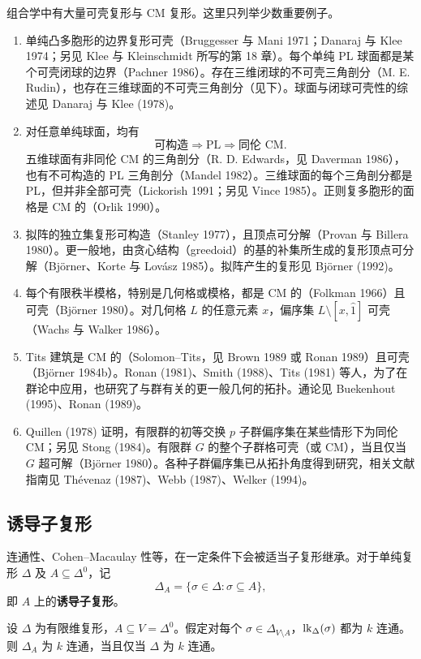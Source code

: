 组合学中有大量可壳复形与 CM 复形。这里只列举少数重要例子。
\begin{enumerate}[label=(\roman*)]
\item 单纯凸多胞形的边界复形可壳（Bruggesser 与 Mani 1971；Danaraj 与 Klee 1974；另见 Klee 与 Kleinschmidt 所写的第 18 章）。每个单纯 PL 球面都是某个可壳闭球的边界（Pachner 1986）。存在三维闭球的不可壳三角剖分（M. E. Rudin），也存在三维球面的不可壳三角剖分（见下）。球面与闭球可壳性的综述见 Danaraj 与 Klee (1978)。
\item 对任意单纯球面，均有
\[
\text{可构造}\Longrightarrow\mathrm{PL}\Longrightarrow\text{同伦 CM}.
\]
五维球面有非同伦 CM 的三角剖分（R. D. Edwards，见 Daverman 1986），也有不可构造的 PL 三角剖分（Mandel 1982）。三维球面的每个三角剖分都是 PL，但并非全部可壳（Lickorish 1991；另见 Vince 1985）。正则复多胞形的面格是 CM 的（Orlik 1990）。
\item 拟阵的独立集复形可构造（Stanley 1977），且顶点可分解（Provan 与 Billera 1980）。更一般地，由贪心结构（greedoid）的基的补集所生成的复形顶点可分解（Björner、Korte 与 Lovász 1985）。拟阵产生的复形见 Björner (1992)。
\item 每个有限秩半模格，特别是几何格或模格，都是 CM 的（Folkman 1966）且可壳（Björner 1980）。对几何格 $L$ 的任意元素 $x$，偏序集 $L\setminus[x,\hat1]$ 可壳（Wachs 与 Walker 1986）。
\item Tits 建筑是 CM 的（Solomon--Tits，见 Brown 1989 或 Ronan 1989）且可壳（Björner 1984b）。Ronan (1981)、Smith (1988)、Tits (1981) 等人，为了在群论中应用，也研究了与群有关的更一般几何的拓扑。通论见 Buekenhout (1995)、Ronan (1989)。
\item Quillen (1978) 证明，有限群的初等交换 $p$ 子群偏序集在某些情形下为同伦 CM；另见 Stong (1984)。有限群 $G$ 的整个子群格可壳（或 CM），当且仅当 $G$ 超可解（Björner 1980）。各种子群偏序集已从拓扑角度得到研究，相关文献指南见 Thévenaz (1987)、Webb (1987)、Welker (1994)。
\end{enumerate}

\subsection*{诱导子复形}
连通性、Cohen--Macaulay 性等，在一定条件下会被适当子复形继承。对于单纯复形 $\Delta$ 及 $A\subseteq\Delta^0$，记
\[
\Delta_A=\{\sigma\in\Delta:\sigma\subseteq A\},
\]
即 $A$ 上的\textbf{诱导子复形}。

设 $\Delta$ 为有限维复形，$A\subseteq V=\Delta^0$。假定对每个 $\sigma\in\Delta_{V\setminus A}$，$\operatorname{lk}_\Delta(\sigma)$ 都为 $k$ 连通。则 $\Delta_A$ 为 $k$ 连通，当且仅当 $\Delta$ 为 $k$ 连通。

